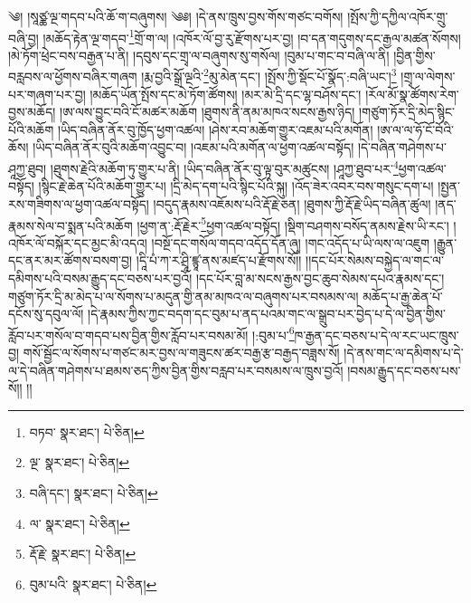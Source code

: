 \setcounter{footnote}{0} 
༄། །སཱཙྪ་ལྔ་གདབ་པའི་ཆོ་ག་བཞུགས། ༄༅། །དེ་ནས་ཁྲུས་བྱས་གོས་གཙང་བགོས། །སྤོས་ཀྱི་དཀྱིལ་འཁོར་གྲུ་བཞི་བྱ། །མཆོད་རྟེན་ལྔ་གདབ་\footnote{བཏབ་  སྣར་ཐང་།  པེ་ཅིན། }གྲོ་ག་ལ། །འཁོར་ལོ་བྱ་རུ་རྫོགས་པར་བྱ། །བ་དན་གདུགས་དང་རྒྱལ་མཚན་སོགས། །མེ་ཏོག་ཕྲེང་བས་བརྒྱན་པ་ནི། །དབུས་དང་གྲྭ་ལ་བཞུགས་སུ་གསོལ། །བུམ་པ་གང་བ་བཞི་ལ་ནི། །བྱིན་གྱིས་བརླབས་ལ་ཕྱོགས་བཞིར་གཞག །རྨ་བྱའི་སྒྲོ་ལྔའི་\footnote{ལྔ་  སྣར་ཐང་།  པེ་ཅིན། }མུ་མེན་དང་། །སྤོས་ཀྱི་སྡོང་པོ་སྣོད་:བཞི་ཡང་།\footnote{བཞི་དང་།  སྣར་ཐང་།  པེ་ཅིན། } །གྲྭ་ལ་ལེགས་པར་གཞག་པར་བྱ། །མཆོད་ཡོན་སྤོས་དང་མེ་ཏོག་ཚོགས། །མར་མེ་དྲི་དང་ལྷ་བཤོས་དང་། །རོལ་མོ་སྣ་ཚོགས་རེག་བྱས་མཆོད། །ཨ་ལས་བྱུང་བའི་ངོ་མཚར་མཆོག །ཐུགས་ནི་ནམ་མཁའ་སངས་རྒྱས་ཉིད། །གཙུག་ཏོར་དྲི་མེད་སྙིང་པོའི་མཆོག །ཡིད་བཞིན་ནོར་བུ་ཁྱོད་ཕྱག་འཚལ། །ཤེས་རབ་མཆོག་གྱུར་འཇམ་པའི་མགོན། །ཨ་ལ་ལ་ཧོ་ངོ་བོའི་ཆོས། །ཡིད་བཞིན་ནོར་བུའི་མཆོག་འབྱུང་བ། །འཇམ་པའི་མགོན་ལ་ཕྱག་འཚལ་བསྟོད། །དེ་བཞིན་གཤེགས་པ་ཤཱཀྱ་ཐུབ། །ཐུགས་རྗེའི་མཆོག་ཏུ་གྱུར་པ་ནི། །ཡིད་བཞིན་ནོར་བུ་ལྟ་བུར་མཚུངས། །ཤཱཀྱ་ཐུབ་པར་\footnote{ལ་  སྣར་ཐང་།  པེ་ཅིན། }ཕྱག་འཚལ་བསྟོད། །སྙིང་རྗེ་ཆེན་པོའི་མཆོག་གྱུར་པ། །དྲི་མེད་དག་པའི་སྙིང་པོའི་སྐུ། །འོད་ཟེར་འབར་བས་གསུང་དག་པ། །སྤྱན་རས་གཟིགས་ལ་ཕྱག་འཚལ་བསྟོད། །བདུད་རྣམས་འཇོམས་པའི་རྡོ་རྗེ་ཅན། །ཐུགས་ཀྱི་རྡོ་རྗེ་ཡིད་བཞིན་ཚུལ། །ནད་རྣམས་སེལ་བ་སྨན་པའི་མཆོག །ཕྱག་ན་:རྡོ་རྗེར་\footnote{རྡོ་རྗེ་  སྣར་ཐང་།  པེ་ཅིན། }ཕྱག་འཚལ་བསྟོད། །སྡིག་བཤགས་བསོད་ནམས་རྗེས་ཡི་རང་། །འཁོར་ལོ་བསྐོར་དང་མྱང་མི་འདའ། །བསྔོ་དང་གསོལ་གདབ་འདོད་དོན་ཞུ། །གང་འདོད་པ་ཡི་ལས་ལ་འཇུག །རྒྱུན་དང་ནར་མར་ཚོགས་བསག་བྱ། །དཱི་པཾ་ཀ་ར་ཤྲཱི་ཛྙཱ་ནས་མཛད་པ་རྫོགས་སོ།། །།དང་པོར་སེམས་བསྐྱེད་ལ་གང་ལ་དམིགས་པའི་བསམ་རྒྱུད་དང་བཅས་པར་བྱའོ། །དང་པོར་བླ་མ་སངས་རྒྱས་བྱང་ཆུབ་སེམས་དཔའ་རྣམས་དང་། གཙུག་ཏོར་དྲི་མ་མེད་པ་ལ་སོགས་པ་མདུན་གྱི་ནམ་མཁའ་ལ་བཞུགས་པར་བསམས་ལ། མཆོད་པ་རྒྱ་ཆེན་པོ་དངོས་སུ་དབུལ་ལོ། །དེ་རྣམས་ཀྱིས་ཀྱང་བདག་དང་བུམ་པ་ནད་པའམ་གང་ལ་སྒྲུབ་པར་བྱེད་པ་དེ་ལ་བྱིན་གྱིས་རློབ་པར་གསོལ་བ་གདབ་པས་བྱིན་གྱིས་རློབ་པར་བསམ་མོ། །:བུམ་པ་\footnote{བུམ་པའི་  སྣར་ཐང་།  པེ་ཅིན། }ཁ་རྒྱན་དང་བཅས་པ་དེ་ལ་རང་ཡང་ཁྲུས་བྱ། གསོ་སྦྱོང་ལ་སོགས་པ་གཙང་མར་བྱས་ལ་གཟུངས་ཚར་བརྒྱ་རྩ་བརྒྱད་བཟླས་སོ། །དེ་ནས་གང་ལ་དམིགས་པ་དེ་ལ་དེ་བཞིན་གཤེགས་པ་ཐམས་ཅད་ཀྱིས་བྱིན་གྱིས་བརླབ་པར་བསམས་ལ་ཁྲུས་བྱའོ། །བསམ་རྒྱུད་དང་བཅས་པས་སོ།། །།